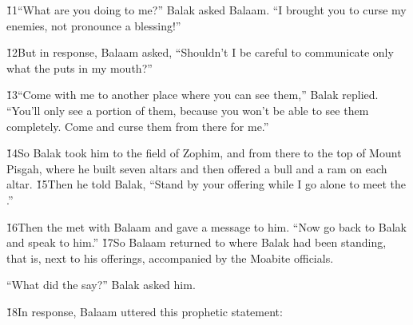 \v{11}``What are you doing to me?'' Balak asked Balaam. ``I brought you to curse my enemies, not pronounce a blessing!''

\v{12}But in response, Balaam asked, ``Shouldn't I be careful to communicate only what the  puts in my mouth?''

\v{13}``Come with me to another place where you can see them,'' Balak replied. ``You'll only see a portion of them, because you won't be able to see them completely. Come and curse them from there for me.''

\v{14}So Balak took him to the field of Zophim, and from there to the top of Mount Pisgah, where he built seven altars and then offered a bull and a ram on each altar. \v{15}Then he told Balak, ``Stand by your offering while I go alone to meet the .''

\v{16}Then the  met with Balaam and gave a message to him. ``Now go back to Balak and speak to him.'' \v{17}So Balaam returned to where Balak had been standing, that is, next to his offerings, accompanied by the Moabite officials.

``What did the  say?'' Balak asked him.

\v{18}In response, Balaam uttered this prophetic statement:


